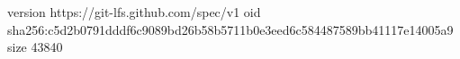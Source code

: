 version https://git-lfs.github.com/spec/v1
oid sha256:c5d2b0791dddf6c9089bd26b58b5711b0e3eed6c584487589bb41117e14005a9
size 43840
